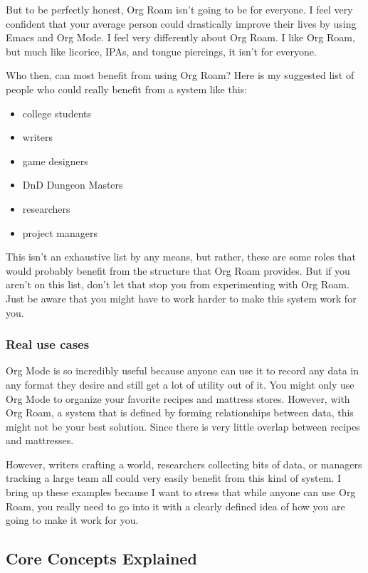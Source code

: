 \documentclass[11pt]{article}
\begin{document}
But to be perfectly honest, Org Roam isn't going to be for everyone. I feel very confident that your average person could drastically improve their lives by using Emacs and Org Mode. I feel very differently about Org Roam. I like Org Roam, but much like licorice, IPAs, and tongue piercings, it isn't for everyone.

Who then, can most benefit from using Org Roam? Here is my suggested list of people who could really benefit from a system like this:

\begin{itemize}
\item college students
\item writers
\item game designers
\item DnD Dungeon Masters
\item researchers
\item project managers
\end{itemize}

This isn't an exhaustive list by any means, but rather, these are some roles that would probably benefit from the structure that Org Roam provides. But if you aren't on this list, don't let that stop you from experimenting with Org Roam. Just be aware that you might have to work harder to make this system work for you.
\subsubsection*{Real use cases}
\label{sec:orga5a4fe9}
Org Mode is so incredibly useful because anyone can use it to record any data in any format they desire and still get a lot of utility out of it. You might only use Org Mode to organize your favorite recipes and mattress stores. However, with Org Roam, a system that is defined by forming relationships between data, this might not be your best solution. Since there is very little overlap between recipes and mattresses.

However, writers crafting a world, researchers collecting bits of data, or managers tracking a large team all could very easily benefit from this kind of system. I bring up these examples because I want to stress that while anyone can use Org Roam, you really need to go into it with a clearly defined idea of how you are going to make it work for you.
\subsection*{Core Concepts Explained}
\label{sec:org5bd08c3}
\end{document}
